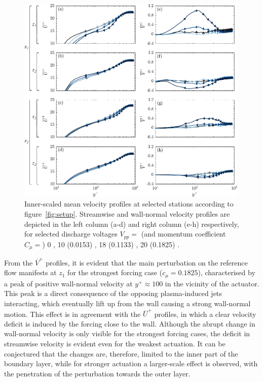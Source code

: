 \begin{figure}[h!] %
    \centering
    \includegraphics[width = 0.99\textwidth]{figures/results/TBL/U_V_profilesv3.pdf}
    \caption{Inner-scaled mean velocity profiles at selected stations according to figure~\ref{fig:setup}. Streamwise and wall-normal velocity profiles are depicted in the left column (a-d) and right column (e-h) respectively, for selected discharge voltages $V_{pp}=$ (and momentum coefficient $C_\mu = $) 0 , 10 (0.0153) , 18 (0.1133) , 20 (0.1825) .}
    \label{fig:UmVmprofile}
\end{figure}%

From the $\overline{V}^+$ profiles, it is evident that the main perturbation on the reference flow manifests at $z_1$ for the strongest forcing case ($c_{\mu} = 0.1825$), characterised by a peak of positive wall-normal velocity at $y^+\approx 100$ in the vicinity of the actuator. This peak is a direct consequence of the opposing plasma-induced jets interacting, which eventually lift up from the wall causing a strong wall-normal motion. This effect is in agreement with the $\overline{U}^+$ profiles, in which a clear velocity deficit is induced by the forcing close to the wall.
Although the abrupt change in wall-normal velocity is only visible for the strongest forcing cases, the deficit in streamwise velocity is evident even for the weakest actuation. It can be conjectured that the changes are, therefore, limited to the inner part of the boundary layer, while for stronger actuation a larger-scale effect is observed, with the penetration of the perturbation towards the outer layer.

